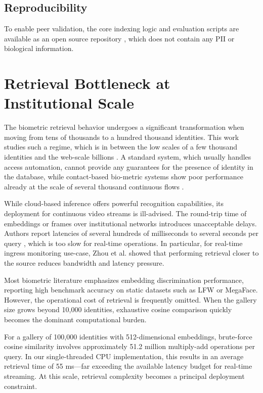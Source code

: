 \documentclass[conference]{IEEEtran}
\begin{document}
\subsection{Reproducibility}
To enable peer validation, the core indexing logic and evaluation scripts are available as an open source repository \cite{scholarmaster_repo}, which does not contain any PII or biological information.

\section{Retrieval Bottleneck at Institutional Scale}

The biometric retrieval behavior undergoes a significant transformation when moving from tens of thousands to a hundred thousand identities. This work studies such a regime, which is in between the low scales of a few thousand identities and the web-scale billions \cite{b1, b8}. A standard system, which usually handles access automation, cannot provide any guarantees for the presence of identity in the database, while contact-based bio-metric systems \cite{b1} show poor performance already at the scale of several thousand continuous flows \cite{b8}.

While cloud-based inference offers powerful recognition capabilities, its deployment for continuous video streams is ill-advised. The round-trip time of embeddings or frames over institutional networks introduces unacceptable delays. Authors report latencies of several hundreds of milliseconds to several seconds per query \cite{b9}, which is too slow for real-time operations. In particular, for real-time ingress monitoring use-case, Zhou et al. \cite{b2} showed that performing retrieval closer to the source reduces bandwidth and latency pressure.

Most biometric literature emphasizes embedding discrimination performance, reporting high benchmark accuracy on static datasets such as LFW or MegaFace. However, the operational cost of retrieval is frequently omitted. When the gallery size grows beyond 10,000 identities, exhaustive cosine comparison quickly becomes the dominant computational burden.

For a gallery of 100,000 identities with 512-dimensional embeddings, brute-force cosine similarity involves approximately 51.2 million multiply-add operations per query. In our single-threaded CPU implementation, this results in an average retrieval time of 55 ms---far exceeding the available latency budget for real-time streaming. At this scale, retrieval complexity becomes a principal deployment constraint.
\end{document}
